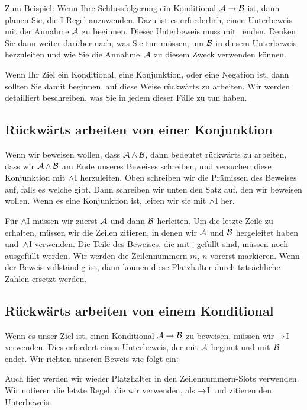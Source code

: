 Zum Beispiel: Wenn Ihre Schlussfolgerung ein Konditional $\mathcal{A}\rightarrow\mathcal{B}$ ist, dann planen Sie, die {\eif}I-Regel anzuwenden. Dazu ist es erforderlich, einen Unterbeweis mit der Annahme $\mathcal{A}$ zu beginnen. Dieser Unterbeweis muss mit~ enden. Denken Sie dann weiter darüber nach, was Sie tun müssen, um $\mathcal{B}$ in diesem Unterbeweis herzuleiten und wie Sie die Annahme~$\mathcal{A}$ zu diesem Zweck verwenden können.

Wenn Ihr Ziel ein Konditional, eine Konjunktion, oder eine Negation ist, dann sollten Sie damit beginnen, auf diese Weise rückwärts zu arbeiten. Wir werden detailliert beschreiben, was Sie in jedem dieser Fälle zu tun haben.

\subsection*{Rückwärts arbeiten von einer Konjunktion}

Wenn wir beweisen wollen, dass $\mathcal{A} \wedge \mathcal{B}$, dann bedeutet rückwärts zu arbeiten, dass wir $\mathcal{A} \wedge \mathcal{B}$ am Ende unseres Beweises schreiben, und versuchen diese Konjunktion mit $\wedge$I herzuleiten. Oben schreiben wir die Prämissen des Beweises auf, falls es welche gibt. Dann schreiben wir unten den Satz auf, den wir beweisen wollen. Wenn es eine Konjunktion ist, leiten wir sie mit $\wedge$I her.
  \begin{fitchproof}
	\ellipsesline 
\ellipsesline
    \ellipsesline 
  \end{fitchproof}
Für $\wedge$I müssen wir zuerst $\mathcal{A}$ und dann $\mathcal{B}$ herleiten. Um die letzte Zeile zu erhalten, müssen wir die Zeilen zitieren, in denen wir $\mathcal{A}$ und $\mathcal{B}$ hergeleitet haben und~$\wedge$I verwenden. Die Teile des Beweises, die mit $\vdots$ gefüllt sind, müssen noch ausgefüllt werden. Wir werden die Zeilennummern $m$, $n$ vorerst markieren. Wenn der Beweis vollständig ist, dann können diese Platzhalter durch tatsächliche Zahlen ersetzt werden.

\subsection*{Rückwärts arbeiten von einem Konditional}

Wenn es unser Ziel ist, einen Konditional $\mathcal{A} \rightarrow \mathcal{B}$ zu beweisen, müssen wir $\rightarrow$I verwenden. Dies erfordert einen Unterbeweis, der mit $\mathcal{A}$ beginnt und mit~$\mathcal{B}$ endet. Wir richten unseren Beweis wie folgt ein:
\begin{fitchproof}
\open
{}
\ellipsesline 
{}
\close
{}
\end{fitchproof} 
Auch hier werden wir wieder Platzhalter in den Zeilennummern-Slots verwenden. Wir notieren die letzte Regel, die wir verwenden, als $\rightarrow$I und zitieren den Unterbeweis.

